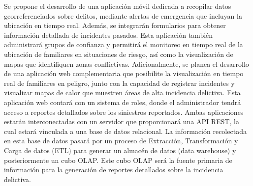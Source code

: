 Se propone el desarrollo de una aplicación móvil dedicada a recopilar datos georreferenciados
sobre delitos, mediante alertas de emergencia que incluyan la ubicación en tiempo real. Además,
se integrarán formularios para obtener información detallada de incidentes pasados. Esta aplicación
también administrará grupos de confianza y permitirá el monitoreo en tiempo real de la ubicación
de familiares en situaciones de riesgo, así como la visualización de mapas que identifiquen
zonas conflictivas. Adicionalmente, se planea el desarrollo de una aplicación web complementaria
que posibilite la visualización en tiempo real de familiares en peligro, junto con la capacidad
de registrar incidentes y visualizar mapas de calor que muestren áreas de alta incidencia delictiva.
Esta aplicación web contará con un sistema de roles, donde el administrador tendrá acceso a reportes
detallados sobre los siniestros reportados. Ambas aplicaciones estarán interconectadas con un
servidor que proporcionará una API REST, la cual estará vinculada a una base de datos relacional.
La información recolectada en esta base de datos pasará por un proceso de Extracción, Transformación
y Carga de datos (ETL)  para generar un almacén de datos (data warehouse) y posteriormente un cubo
OLAP. Este cubo OLAP será la fuente primaria de información para la generación de reportes detallados
sobre la incidencia delictiva.